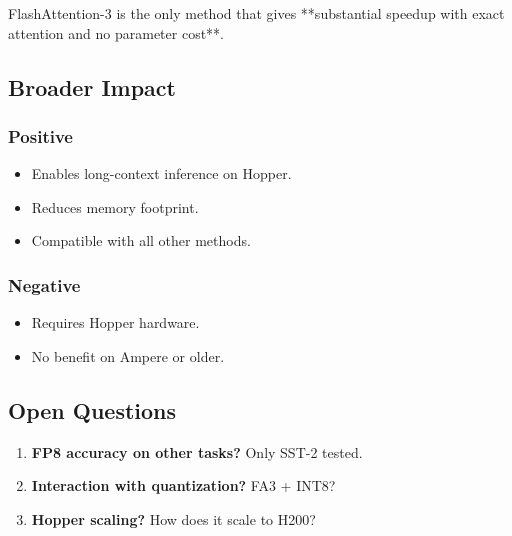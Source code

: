 FlashAttention-3 is the only method that gives **substantial speedup with 
exact attention and no parameter cost**.

\subsection{Broader Impact}

\subsubsection{Positive}
\begin{itemize}
\item Enables long-context inference on Hopper.
\item Reduces memory footprint.
\item Compatible with all other methods.

\end{itemize}
\subsubsection{Negative}
\begin{itemize}
\item Requires Hopper hardware.
\item No benefit on Ampere or older.

\end{itemize}
\subsection{Open Questions}

\begin{enumerate}
\item \textbf{FP8 accuracy on other tasks?} Only SST-2 tested.
\item \textbf{Interaction with quantization?} FA3 + INT8?
\item \textbf{Hopper scaling?} How does it scale to H200?

\end{enumerate}
